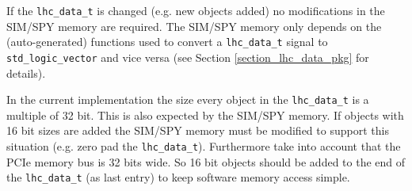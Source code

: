 If the \texttt{lhc\_data\_t} is changed (e.g. new objects added) no modifications in the SIM/SPY memory are required. The SIM/SPY memory only depends on the (auto-generated) 
functions used to convert a \texttt{lhc\_data\_t} signal to \texttt{std\_logic\_vector} and vice versa (see Section \ref{section_lhc_data_pkg} for details).

In the current implementation the size every object in the \texttt{lhc\_data\_t} is a multiple of 32 bit. This is also expected by the SIM/SPY memory. If objects with 16 bit sizes 
are added the SIM/SPY memory must be modified to support this situation (e.g. zero pad the \texttt{lhc\_data\_t}). Furthermore take into account that the PCIe memory bus is 32 bits wide. 
So 16 bit objects should be added to the end of the \texttt{lhc\_data\_t} (as last entry) to keep software memory access simple.


